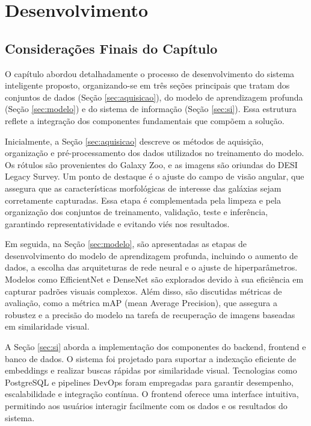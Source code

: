 \chapter{Desenvolvimento}
\label{cap:desenvolvimento}







\section{Considerações Finais do Capítulo}
\label{sec:conclusao-desenvolvimento}

O capítulo abordou detalhadamente o processo de desenvolvimento do sistema inteligente proposto, organizando-se em três seções principais que tratam dos conjuntos de dados (Seção \ref{sec:aquisicao}), do modelo de aprendizagem profunda (Seção \ref{sec:modelo}) e do sistema de informação (Seção \ref{sec:si}). Essa estrutura reflete a integração dos componentes fundamentais que compõem a solução.

Inicialmente, a Seção \ref{sec:aquisicao} descreve os métodos de aquisição, organização e pré-processamento dos dados utilizados no treinamento do modelo. Os rótulos são provenientes do Galaxy Zoo, e as imagens são oriundas do DESI Legacy Survey. Um ponto de destaque é o ajuste do campo de visão angular, que assegura que as características morfológicas de interesse das galáxias sejam corretamente capturadas. Essa etapa é complementada pela limpeza e pela organização dos conjuntos de treinamento, validação, teste e inferência, garantindo representatividade e evitando viés nos resultados.

Em seguida, na Seção \ref{sec:modelo}, são apresentadas as etapas de desenvolvimento do modelo de aprendizagem profunda, incluindo o aumento de dados, a escolha das arquiteturas de rede neural e o ajuste de hiperparâmetros. Modelos como EfficientNet e DenseNet são explorados devido à sua eficiência em capturar padrões visuais complexos. Além disso, são discutidas métricas de avaliação, como a métrica mAP (mean Average Precision), que assegura a robustez e a precisão do modelo na tarefa de recuperação de imagens baseadas em similaridade visual.

A Seção \ref{sec:si} aborda a implementação dos componentes do backend, frontend e banco de dados. O sistema foi projetado para suportar a indexação eficiente de embeddings e realizar buscas rápidas por similaridade visual. Tecnologias como PostgreSQL e pipelines DevOps foram empregadas para garantir desempenho, escalabilidade e integração contínua. O frontend oferece uma interface intuitiva, permitindo aos usuários interagir facilmente com os dados e os resultados do sistema.

